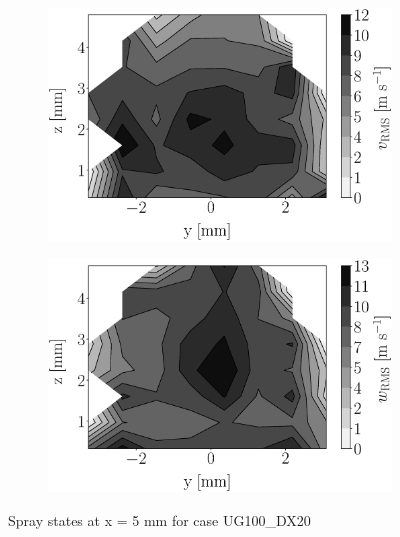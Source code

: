 \begin{figure}[h!]
\begin{subfigure}[b]{0.22\textwidth}
	\centering
   \includegraphics[scale=0.17]{./part2_developments/figures_ch5_resolved_JICF/injectors_SLI/uG100_dx20_x05_uy_rms_map.eps}
\end{subfigure}
   \hspace{0.17in}
\begin{subfigure}[b]{0.22\textwidth}
	\centering
   \includegraphics[scale=0.17]{./part2_developments/figures_ch5_resolved_JICF/injectors_SLI/uG100_dx20_x05_uz_rms_map.eps}
\end{subfigure}
\caption{Spray states at x = 5 mm for case UG100\_DX20}
\label{fig:injectors_sli_uG100_dx20_x05}
\end{figure}




